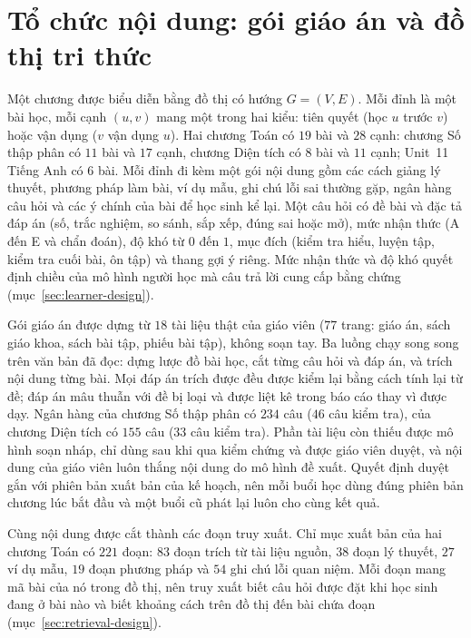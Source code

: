 \section{Tổ chức nội dung: gói giáo án và đồ thị tri thức}\label{sec:content-design}
Một chương được biểu diễn bằng đồ thị có hướng $G=(V,E)$. Mỗi đỉnh là một bài học, mỗi cạnh $(u,v)$ mang một trong hai kiểu: tiên quyết (học $u$ trước $v$) hoặc vận dụng ($v$ vận dụng $u$). Hai chương Toán có $19$ bài và $28$ cạnh: chương Số thập phân có $11$ bài và $17$ cạnh, chương Diện tích có $8$ bài và $11$ cạnh; Unit~11 Tiếng Anh có $6$ bài. Mỗi đỉnh đi kèm một gói nội dung gồm các cách giảng lý thuyết, phương pháp làm bài, ví dụ mẫu, ghi chú lỗi sai thường gặp, ngân hàng câu hỏi và các ý chính của bài để học sinh kể lại. Một câu hỏi có đề bài và đặc tả đáp án (số, trắc nghiệm, so sánh, sắp xếp, đúng sai hoặc mở), mức nhận thức (A đến E và chẩn đoán), độ khó từ $0$ đến $1$, mục đích (kiểm tra hiểu, luyện tập, kiểm tra cuối bài, ôn tập) và thang gợi ý riêng. Mức nhận thức và độ khó quyết định chiều của mô hình người học mà câu trả lời cung cấp bằng chứng (mục~\ref{sec:learner-design}).

Gói giáo án được dựng từ $18$ tài liệu thật của giáo viên ($77$ trang: giáo án, sách giáo khoa, sách bài tập, phiếu bài tập), không soạn tay. Ba luồng chạy song song trên văn bản đã đọc: dựng lược đồ bài học, cắt từng câu hỏi và đáp án, và trích nội dung từng bài. Mọi đáp án trích được đều được kiểm lại bằng cách tính lại từ đề; đáp án mâu thuẫn với đề bị loại và được liệt kê trong báo cáo thay vì được dạy. Ngân hàng của chương Số thập phân có $234$ câu ($46$ câu kiểm tra), của chương Diện tích có $155$ câu ($33$ câu kiểm tra). Phần tài liệu còn thiếu được mô hình soạn nháp, chỉ dùng sau khi qua kiểm chứng và được giáo viên duyệt, và nội dung của giáo viên luôn thắng nội dung do mô hình đề xuất. Quyết định duyệt gắn với phiên bản xuất bản của kế hoạch, nên mỗi buổi học dùng đúng phiên bản chương lúc bắt đầu và một buổi cũ phát lại luôn cho cùng kết quả.

Cùng nội dung được cắt thành các đoạn truy xuất. Chỉ mục xuất bản của hai chương Toán có $221$ đoạn: $83$ đoạn trích từ tài liệu nguồn, $38$ đoạn lý thuyết, $27$ ví dụ mẫu, $19$ đoạn phương pháp và $54$ ghi chú lỗi quan niệm. Mỗi đoạn mang mã bài của nó trong đồ thị, nên truy xuất biết câu hỏi được đặt khi học sinh đang ở bài nào và biết khoảng cách trên đồ thị đến bài chứa đoạn (mục~\ref{sec:retrieval-design}).
